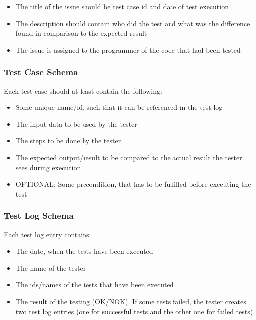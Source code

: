 \documentclass[twoside,12pt,a4paper]{article}
\begin{document}
\begin{itemize}
  \item The title of the issue should be test case id and date of test execution
  \item The description should contain who did the test and what was the difference found in comparison to the expected result
  \item The issue is assigned to the programmer of the code that had been tested
\end{itemize}


\subsubsection{Test Case Schema} %
\label{sub:test_case_schema}

Each test case should at least contain the following:
\begin{itemize}
  \item Some unique name/id, such that it can be referenced in the test log
  \item The input data to be used by the tester
  \item The steps to be done by the tester
  \item The expected output/result to be compared to the actual result the tester sees during execution
  \item OPTIONAL: Some precondition, that has to be fulfilled before executing 
the test
\end{itemize}


\subsubsection{Test Log Schema} %
\label{sub:test_log_schema}

Each test log entry contains:
\begin{itemize}
  \item The date, when the tests have been executed
  \item The name of the tester
  \item The ids/names of the tests that have been executed
  \item The result of the testing (OK/NOK). If some tests failed, the tester creates two test log entries (one for successful tests and the other one for failed tests)
\end{itemize}
\end{document}
